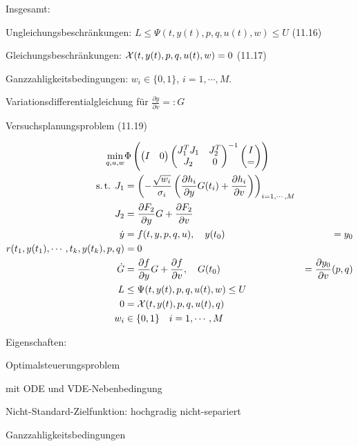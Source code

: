 Insgesamt:

\bitm
\item Ungleichungsbeschränkungen: $L \leq \Psi(t,y(t),p,q,u(t),w) \leq U$ (11.16)
\item Gleichungsbeschränkungen: $\mathcal{X} (t,y(t),p,q,u(t),w) = 0$ (11.17)
\item Ganzzahligkeitsbedingungen: $w_i \in \{0,1\}$, $i=1,\cdots,M$.
\item Variationsdifferentialgleichung für $\frac{\partial y}{\partial v} =: G$
\eitm

Versuchsplanungsproblem (11.19)

\begin{align*}
\min_{q,u,w} &\Phi \left( \begin{pmatrix} I & 0 \end{pmatrix} \begin{pmatrix} J_1^T J_1 & J_2^T \\ J_2 & 0 \end{pmatrix}^{-1} \begin{pmatrix} I \\ = \end{pmatrix} \right) \\
\text{s.\,t. } J_1 &= \left( - \frac{\sqrt{w_i}}{\sigma_i} \left( \frac{\partial h_i}{\partial y} G(t_i) + \frac{\partial h_i}{\partial v} \right) \right)_{i=1,\cdots,M} \\
J_2 &= \frac{\partial F_2}{\partial y} G + \frac{\partial F_2}{\partial v} \\
\dot y &= f(t,y,p,q,u), \quad y(t_0) &= y_0 \\
r(t_1, y(t_1), \cdots, t_k, y(t_k), p, q) &= 0 \\
\dot G &= \frac{\partial f}{\partial y} G + \frac{\partial f}{\partial v}, \quad G(t_0) &= \frac{\partial y_0}{\partial v} (p,q) \\
L & \leq \Psi(t,y(t),p,q,u(t),w) \leq U \\
0 &= \mathcal{X}(t,y(t),p,q,u(t),q) \\
w_i & \in \{0,1\} \quad i = 1,\cdots, M \\
\end{align*}

Eigenschaften:

\bitm
\item Optimalsteuerungsproblem
\item mit ODE und VDE-Nebenbedingung
\item Nicht-Standard-Zielfunktion: hochgradig nicht-separiert
\item Ganzzahligkeitsbedingungen
\eitm


